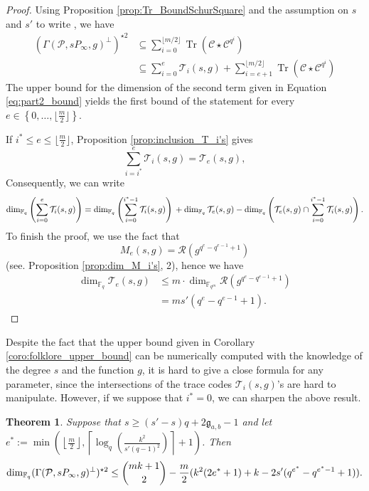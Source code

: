 \documentclass[peerreview]{IEEEtran}
\theoremstyle{plain}
\newtheorem{thm}{Theorem}[section]
\theoremstyle{definition}
\theoremstyle{remark}
\DeclareMathOperator{\trace}{Tr}
\newcommand{\calP}{\mathcal{P}}
\newcommand{\calC}{\mathcal{C}}
\newcommand{\calR}{\mathcal{R}}
\newcommand{\calT}{\mathcal{T}}
\newcommand{\fqm}{\mathbb{F}_{q^m}}
\newcommand{\fq}{\mathbb{F}_{q}}
\newcommand{\Tr}[1]{\trace\!\left(#1\right)}
\newcommand{\set}[1]{\left\{#1\right\}}
\begin{document}
	\begin{proof}
		Using Proposition \ref{prop:Tr_BoundSchurSquare} and the assumption on $s$ and $s'$ to write , we have
		\begin{align*}
			\left(\Gamma(\calP,sP_\infty,g)^{\perp}\right)^{\star 2}
			& \subseteq \sum\limits_{i=0}^{\lfloor m/2 \rfloor} \Tr{\calC \star                     \calC^{q^i}} \\
			& \subseteq \sum\limits_{i=0}^{e}\calT_i(s,g) + \sum\limits_{i=e+1}^{\lfloor m/2 \rfloor} \Tr{\calC \star \calC^{q^i}}
		\end{align*}
		The upper bound for the dimension of the second term given in Equation \eqref{eq:part2_bound} yields the first bound of the statement for every $e \in \set{0,\dots,\lfloor \frac{m}{2} \rfloor}$.
		
		\medskip
		
		If $i^* \leq e \leq \lfloor \frac{m}{2} \rfloor$,  Proposition \ref{prop:inclusion_T_i's} gives
		\[\sum\limits_{i=i^*}^e \calT_i(s,g) = \calT_e(s,g),\]
		Consequently, we can write 
		\[\dim_{\fq} \left(\sum\limits_{i=0}^{e}\calT_i(s,g)\right) = \dim_{\fq} \left(\sum\limits_{i=0}^{i^*-1}\calT_i(s,g)\right) \\ + \dim_{\fq}\calT_e(s,g)  \\- \dim_{\fq} \left( \calT_e(s,g) \cap   \sum\limits_{i=0}^{i^*-1} \calT_i(s,g)\right).
		\]
		To finish the proof, we use the fact that 
		\[M_e(s,g) = \calR\left(g^{q^e-q^{e-1}+1}\right)\]
		(see. Proposition \ref{prop:dim_M_i's}, 2), hence we have
		\begin{align}
			\dim_{\fq}\calT_e(s,g) &\leq m \cdot \dim_{\fqm} \calR\left(g^{q^e-q^{e-1}+1}\right)\\ \label{eq:dimTe}
								   & = m s' (q^e-q^{e-1}+1).
		\end{align}
	\end{proof}
	
	Despite the fact that the upper bound given in Corollary \ref{coro:folklore_upper_bound} can be numerically computed with the knowledge of the degree $s$ and the function $g$, it is hard to give a close formula for any parameter, since the intersections of the trace codes $\calT_i(s,g)$'s are hard to manipulate. However, if we suppose that $i^*=0$, we can sharpen the above result.
	
	\begin{thm} \label{thm:bound_with_T_i's_inclusion} 
		Suppose that $s \geq (s'-s)q+2\mathfrak{g}_{a,b}-1$ and let $e^* := \min\left(\left\lfloor \frac{m}{2} \right\rfloor, \left\lceil \log_q\left(\frac{k^2}{s'(q-1)^2}\right)\right\rceil+1\right)$. Then
		\[\dim_{\fq} (\Gamma(\calP,sP_\infty,g)^{\perp})^{\star 2}\leq \binom{mk+1}{2} \\- \dfrac{m}{2}(k^2(2e^*+1)+k-2s'(q^{e^*}-q^{e^*-1}+1)).\]
	\end{thm}
	
\end{document}
